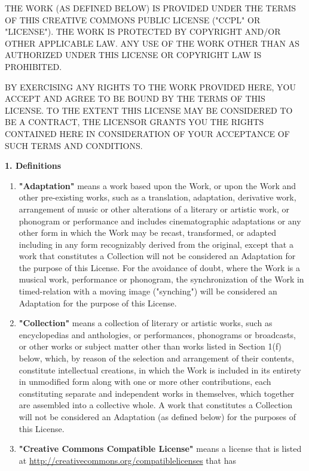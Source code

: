 
THE WORK (AS DEFINED BELOW) IS PROVIDED UNDER THE TERMS OF THIS
CREATIVE COMMONS PUBLIC LICENSE ("CCPL" OR "LICENSE"). THE WORK IS
PROTECTED BY COPYRIGHT AND/OR OTHER APPLICABLE LAW. ANY USE OF THE
WORK OTHER THAN AS AUTHORIZED UNDER THIS LICENSE OR COPYRIGHT LAW
IS PROHIBITED.

BY EXERCISING ANY RIGHTS TO THE WORK PROVIDED HERE, YOU ACCEPT AND
AGREE TO BE BOUND BY THE TERMS OF THIS LICENSE. TO THE EXTENT THIS
LICENSE MAY BE CONSIDERED TO BE A CONTRACT, THE LICENSOR GRANTS YOU
THE RIGHTS CONTAINED HERE IN CONSIDERATION OF YOUR ACCEPTANCE OF
SUCH TERMS AND CONDITIONS.

\quad

\noindent \textbf{1. Definitions}

\begin{enumerate}
\item
  \textbf{"Adaptation"} means a work based upon the Work, or upon the
  Work and other pre-existing works, such as a translation,
  adaptation, derivative work, arrangement of music or other
  alterations of a literary or artistic work, or phonogram or
  performance and includes cinematographic adaptations or any other
  form in which the Work may be recast, transformed, or adapted
  including in any form recognizably derived from the original,
  except that a work that constitutes a Collection will not be
  considered an Adaptation for the purpose of this License. For the
  avoidance of doubt, where the Work is a musical work, performance
  or phonogram, the synchronization of the Work in timed-relation
  with a moving image ("synching") will be considered an Adaptation
  for the purpose of this License.
\item
  \textbf{"Collection"} means a collection of literary or artistic
  works, such as encyclopedias and anthologies, or performances,
  phonograms or broadcasts, or other works or subject matter other
  than works listed in Section 1(f) below, which, by reason of the
  selection and arrangement of their contents, constitute
  intellectual creations, in which the Work is included in its
  entirety in unmodified form along with one or more other
  contributions, each constituting separate and independent works in
  themselves, which together are assembled into a collective whole. A
  work that constitutes a Collection will not be considered an
  Adaptation (as defined below) for the purposes of this License.
\item
  \textbf{"Creative Commons Compatible License"} means a license that
  is listed at \url{http://creativecommons.org/compatiblelicenses} that has

\end{enumerate}
